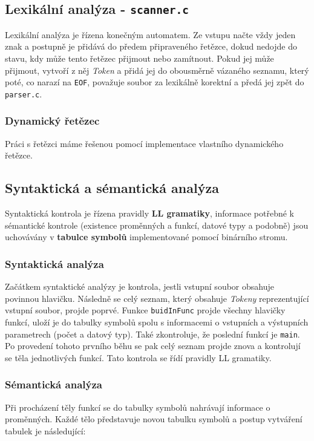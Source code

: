 \documentclass[czech,a4paper,12pt]{article}[]
\begin{document}
\begin{inpar}
\subsection{Lexikální analýza - \texttt{scanner.c}}
Lexikální analýza je řízena konečným automatem. Ze vstupu načte vždy jeden znak a postupně je přidává do předem připraveného řetězce, dokud nedojde do stavu, kdy může tento řetězec přijmout nebo zamítnout. Pokud jej může přijmout, vytvoří z něj \emph{Token} a přidá jej do obousměrně vázaného seznamu, který poté, co narazí na \texttt{EOF}, považuje soubor za lexikálně korektní a předá jej zpět do \texttt{parser.c}.

\begin{inpar}
\subsubsection{Dynamický řetězec}
Práci s řetězci máme řešenou pomocí implementace vlastního dynamického řetězce.
\end{inpar}
\newpage

\subsection{Syntaktická a sémantická analýza}
Syntaktická kontrola je řízena pravidly \textbf{LL gramatiky}, informace potřebné k sémantické kontrole (existence proměnných a funkcí, datové typy a podobně) jsou uchovávány v \textbf{tabulce symbolů} implementované pomocí binárního stromu. 

\begin{inpar}
\subsubsection{Syntaktická analýza}
Začátkem syntaktické analýzy je kontrola, jestli vstupní soubor obsahuje povinnou hlavičku. Následně se celý seznam, který obsahuje \emph{Tokeny} reprezentující vstupní soubor, projde poprvé. Funkce \texttt{buidInFunc} projde všechny hlavičky funkcí, uloží je do tabulky symbolů spolu s informacemi o vstupních a výstupních parametrech (počet a datový typ). Také zkontroluje, že poslední funkcí je \texttt{main}. Po provedení tohoto prvního běhu se pak celý seznam projde znova a kontrolují se těla jednotlivých funkcí. Tato kontrola se řídí pravidly LL gramatiky.

\subsubsection{Sémantická analýza}
Při procházení těly funkcí se do tabulky symbolů nahrávají informace o proměnných. Každé tělo představuje novou tabulku symbolů a postup vytváření tabulek je následující:


\end{inpar}
\end{inpar}
\end{document}
